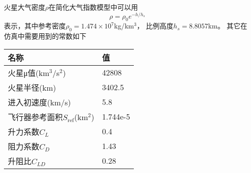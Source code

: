火星大气密度$\rho$在简化大气指数模型中可以用
\[\rho=\rho_0e^{-h/h_s}\]
表示，其中参考密度$\rho_0=1.474\times10^7$kg/km$^3$，
比例高度$h_s=8.8057$km。
其它在仿真中需要用到的常数如下 \\
\begin{center}\begin{tabular}{ll}
    \toprule
    名称 & 值 \\
    \midrule
    火星μ值(km$^3$/s$^2$) & 42808 \\
    火星半径(km) & 3402.5 \\
    进入初速度(km/s) & 5.8 \\
    飞行器参考面积$S_\text{ref}$(km$^2$) & 1.744e-5 \\
    升力系数$C_L$ & 0.4 \\
    阻力系数$C_D$ & 1.43 \\
    升阻比$C_{LD}$ & 0.28 \\
    \bottomrule
\end{tabular}\end{center}
